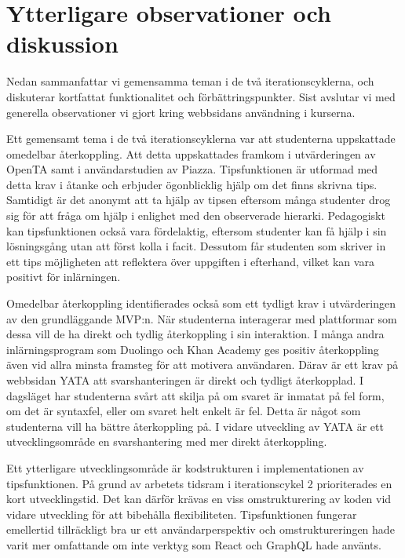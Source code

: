 \section{Ytterligare observationer och diskussion}
\label{sec: webb-D}

Nedan sammanfattar vi gemensamma teman i de två iterationscyklerna, och diskuterar kortfattat funktionalitet och förbättringspunkter. Sist avslutar vi med generella observationer vi gjort kring webbsidans användning i kurserna. 

Ett gemensamt tema i de två iterationscyklerna var att studenterna uppskattade omedelbar återkoppling. Att detta uppskattades framkom i utvärderingen av OpenTA samt i användarstudien av Piazza. Tipsfunktionen är utformad med detta krav i åtanke och erbjuder ögonblicklig hjälp om det finns skrivna tips. Samtidigt är det anonymt att ta hjälp av tipsen eftersom många studenter drog sig för att fråga om hjälp i enlighet med den observerade hierarki. Pedagogiskt kan tipsfunktionen också vara fördelaktig, eftersom studenter kan få hjälp i sin lösningsgång utan att först kolla i facit. Dessutom får studenten som skriver in ett tips möjligheten att reflektera över uppgiften i efterhand, vilket kan vara positivt för inlärningen.

Omedelbar återkoppling identifierades också som ett tydligt krav i utvärderingen av den grundläggande MVP:n. När studenterna interagerar med plattformar som dessa vill de ha direkt och tydlig återkoppling i sin interaktion. I många andra inlärningsprogram som Duolingo och Khan Academy ges positiv återkoppling även vid allra minsta framsteg för att motivera användaren. Därav är ett krav på webbsidan YATA att svarshanteringen är direkt och tydligt återkopplad. I dagsläget har studenterna svårt att skilja på om svaret är inmatat på fel form, om det är syntaxfel, eller om svaret helt enkelt är fel. Detta är något som studenterna vill ha bättre återkoppling på. I vidare utveckling av YATA är ett utvecklingsområde en svarshantering med mer direkt återkoppling.

Ett ytterligare utvecklingsområde är kodstrukturen i implementationen av tipsfunktionen. På grund av arbetets tidsram i iterationscykel 2 prioriterades en kort utvecklingstid. Det kan därför krävas en viss omstrukturering av koden vid vidare utveckling för att bibehålla flexibiliteten. Tipsfunktionen fungerar emellertid tillräckligt bra ur ett användarperspektiv och omstruktureringen hade varit mer omfattande om inte verktyg som React och GraphQL hade använts.

